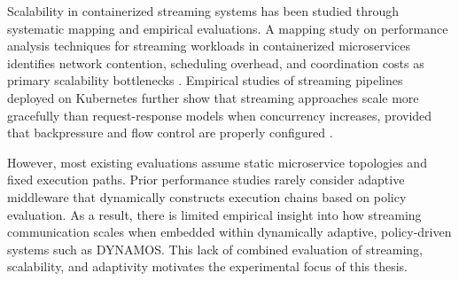 Scalability in containerized streaming systems has been studied through systematic mapping and empirical evaluations. A mapping study on performance analysis techniques for streaming workloads in containerized microservices identifies network contention, scheduling overhead, and coordination costs as primary scalability bottlenecks \cite{systematicstreaming}. Empirical studies of streaming pipelines deployed on Kubernetes further show that streaming approaches scale more gracefully than request-response models when concurrency increases, provided that backpressure and flow control are properly configured \cite{starck2023streaminglb}.

However, most existing evaluations assume static microservice topologies and fixed execution paths. Prior performance studies rarely consider adaptive middleware that dynamically constructs execution chains based on policy evaluation. As a result, there is limited empirical insight into how streaming communication scales when embedded within dynamically adaptive, policy-driven systems such as DYNAMOS. This lack of combined evaluation of streaming, scalability, and adaptivity motivates the experimental focus of this thesis.

